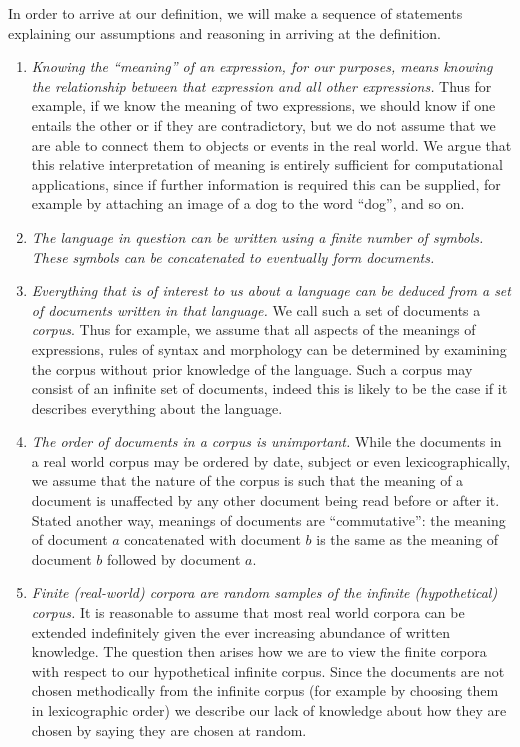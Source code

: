 \documentclass[12pt]{report}
\begin{document}
In order to arrive at our definition, we will make a sequence of statements explaining our assumptions and reasoning in arriving at the definition.
\begin{enumerate}
\item \emph{Knowing the ``meaning'' of an expression, for our purposes, means knowing the relationship between that expression and all other expressions.} Thus for example, if we know the meaning of two expressions, we should know if one entails the other or if they are contradictory, but we do not assume that we are able to connect them to objects or events in the real world. We argue that this relative interpretation of meaning is entirely sufficient for computational applications, since if further information is required this can be supplied, for example by attaching an image of a dog to the word ``dog'', and so on.
\item \emph{The language in question can be written using a finite number of symbols. These symbols can be concatenated to eventually form \emph{documents}.}
\item \emph{Everything that is of interest to us about a language can be deduced from a set of documents written in that language.} We call such a set of documents a \emph{corpus}. Thus for example, we assume that all aspects of the meanings of expressions, rules of syntax and morphology can be determined by examining the corpus without prior knowledge of the language. Such a corpus may consist of an infinite set of documents, indeed this is likely to be the case if it describes everything about the language.
\item \emph{The order of documents in a corpus is unimportant.} While the documents in a real world corpus may be ordered by date, subject or even lexicographically, we assume that the nature of the corpus is such that the meaning of a document is unaffected by any other document being read before or after it. Stated another way, meanings of documents are ``commutative'': the meaning of document $a$ concatenated with document $b$ is the same as the meaning of document $b$ followed by document $a$.
\item \emph{Finite (real-world) corpora are random samples of the infinite (hypothetical) corpus.} It is reasonable to assume that most real world corpora can be extended indefinitely given the ever increasing abundance of written knowledge. The question then arises how we are to view the finite corpora with respect to our hypothetical infinite corpus. Since the documents are not chosen methodically from the infinite corpus (for example by choosing them in lexicographic order) we describe our lack of knowledge about how they are chosen by saying they are chosen at random.


\end{enumerate}
\end{document}
